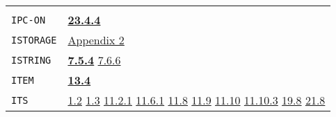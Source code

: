 \documentclass[a4paper]{scrbook}
\begin{document}
\begin{longtable}[]{@{}ll@{}}
\begin{minipage}[t]{0.70\columnwidth}
\end{minipage}\tabularnewline
\begin{minipage}[t]{0.24\columnwidth}\raggedright\strut
\texttt{IPC-ON}\strut
\end{minipage} & \begin{minipage}[t]{0.70\columnwidth}\raggedright\strut
\textbf{\href{23-mdl-as-a-system-process.md\#2344-ipc-on}{23.4.4}}\strut
\end{minipage}\tabularnewline
\begin{minipage}[t]{0.24\columnwidth}\raggedright\strut
\texttt{ISTORAGE}\strut
\end{minipage} & \begin{minipage}[t]{0.70\columnwidth}\raggedright\strut
\href{appendix-2-predefined-subroutines.md\#appendix-2-predefined-subroutines}{Appendix 2}\strut
\end{minipage}\tabularnewline
\begin{minipage}[t]{0.24\columnwidth}\raggedright\strut
\texttt{ISTRING}\strut
\end{minipage} & \begin{minipage}[t]{0.70\columnwidth}\raggedright\strut
\textbf{\href{07-structured-objects.md\#754-ilist-ivector-iuvector-and-istring-1}{7.5.4}}
\href{07-structured-objects.md\#766-string-the-primtype-and-character-1}{7.6.6}\strut
\end{minipage}\tabularnewline
\begin{minipage}[t]{0.24\columnwidth}\raggedright\strut
\texttt{ITEM}\strut
\end{minipage} & \begin{minipage}[t]{0.70\columnwidth}\raggedright\strut
\textbf{\href{13-association-properties.md\#134-examining-associations}{13.4}}\strut
\end{minipage}\tabularnewline
\begin{minipage}[t]{0.24\columnwidth}\raggedright\strut
\texttt{ITS}\strut
\end{minipage} & \begin{minipage}[t]{0.70\columnwidth}\raggedright\strut
\href{01-basic-introduction.md\#12-typing-1}{1.2} \href{01-basic-introduction.md\#13-loading-a-file-1}{1.3}
\href{11-input-output.md\#1121-open}{11.2.1} \href{11-input-output.md\#1161-save}{11.6.1}
\href{11-input-output.md\#118-terminal-channels}{11.8} \href{11-input-output.md\#119-internal-channels}{11.9}
\href{11-input-output.md\#1110-the-net-device-the-arpa-network}{11.10} \href{11-input-output.md\#11103-nets}{11.10.3}
\href{19-compiled-programs.md\#198-rsubrs-in-files}{19.8} \href{21-interrupts.md\#218-specific-interrupts}{21.8}

\end{minipage}
\end{longtable}
\end{document}
